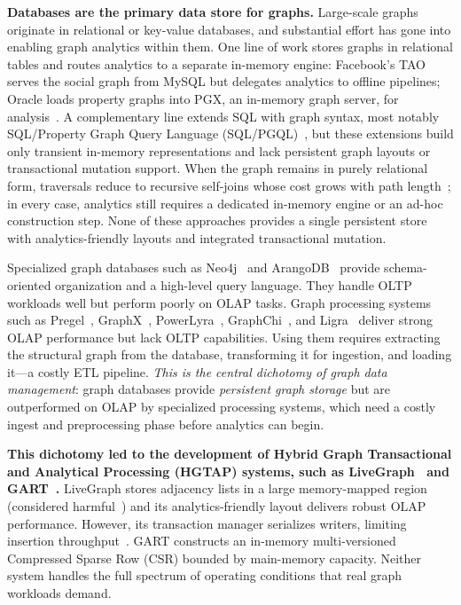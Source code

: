 \textbf{Databases are the primary data store for graphs.}
Large-scale graphs originate in relational or key-value databases, and substantial effort has gone into enabling graph analytics within them.
One line of work stores graphs in relational tables and routes analytics to a separate in-memory engine: Facebook's TAO~\cite{bronson2013tao} serves the social graph from MySQL but delegates analytics to offline pipelines; Oracle loads property graphs into PGX, an in-memory graph server, for analysis~\cite{OraclePG,WhatIsOracleSpatialGraph:online,hong2015pgx,welc2013graph,hong2013early}.
A complementary line extends SQL with graph syntax, most notably SQL/Property Graph Query Language (SQL/PGQL)~\cite{duckpgq:online}, but these extensions build only transient in-memory representations and lack persistent graph layouts or transactional mutation support.
When the graph remains in purely relational form, traversals reduce to recursive self-joins whose cost grows with path length~\cite{10.1145/3129246,TransitiveClosureBiskupStiefeling1989}; in every case, analytics still requires a dedicated in-memory engine or an ad-hoc construction step.
None of these approaches provides a single persistent store with analytics-friendly layouts and integrated transactional mutation.

Specialized graph databases such as Neo4j~\cite{neo4j} and ArangoDB~\cite{arangodb} provide schema-oriented organization and a high-level query language.
They handle OLTP workloads well but perform poorly on OLAP tasks.
Graph processing systems such as Pregel~\cite{malewicz2010pregel}, GraphX~\cite{gonzalez2014graphx}, PowerLyra~\cite{powerlyra2019}, GraphChi~\cite{kyrola2012graphchi}, and Ligra~\cite{shun2013ligra} deliver strong OLAP performance but lack OLTP capabilities.
Using them requires extracting the structural graph from the database, transforming it for ingestion, and loading it---a costly ETL pipeline.
\textit{This is the central dichotomy of graph data management}: graph databases provide \emph{persistent graph storage} but are outperformed on OLAP by specialized processing systems, which need a costly ingest and preprocessing phase before analytics can begin.

\textbf{This dichotomy led to the development of Hybrid Graph Transactional and Analytical Processing (HGTAP) systems, such as LiveGraph~\cite{zhu2019livegraph} and GART~\cite{shen2023bridging}.}
LiveGraph stores adjacency lists in a large memory-mapped region (considered harmful~\cite{crotty2022you}) and its analytics-friendly layout delivers robust OLAP performance. 
However, its transaction manager serializes writers, limiting insertion throughput~\cite{libinzhou2025GTX}.
GART constructs an in-memory multi-versioned Compressed Sparse Row (CSR) bounded by main-memory capacity.
Neither system handles the full spectrum of operating conditions that real graph workloads demand.

